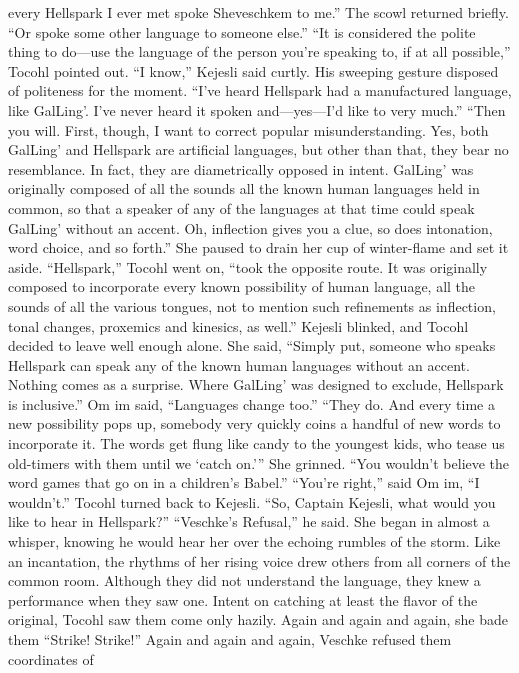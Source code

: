 \documentclass[9pt]{article}
\begin{document}
every Hellspark I ever met spoke Sheveschkem to me.” The scowl returned briefly. “Or spoke some
other language to someone else.”
“It is considered the polite thing to do—use the language of the person you’re speaking to, if at all
possible,” Tocohl pointed out.
“I know,” Kejesli said curtly. His sweeping gesture disposed of politeness for the moment. “I’ve
heard Hellspark had a manufactured language, like GalLing’. I’ve never heard it spoken and—yes—I’d
like to very much.”
“Then you will. First, though, I want to correct popular misunderstanding. Yes, both GalLing’ and
Hellspark are artificial languages, but other than that, they bear no resemblance. In fact, they are
diametrically opposed in intent. GalLing’ was originally composed of all the sounds all the known human
languages held in common, so that a speaker of any of the languages at that time could speak GalLing’
without an accent. Oh, inflection gives you a clue, so does intonation, word choice, and so forth.” She
paused to drain her cup of winter-flame and set it aside.
“Hellspark,” Tocohl went on, “took the opposite route. It was originally composed to incorporate
every known possibility of human language, all the sounds of all the various tongues, not to mention such
refinements as inflection, tonal changes, proxemics and kinesics, as well.”
Kejesli blinked, and Tocohl decided to leave well enough alone. She said, “Simply put, someone
who speaks Hellspark can speak any of the known human languages without an accent. Nothing comes
as a surprise. Where GalLing’ was designed to exclude, Hellspark is inclusive.”
Om im said, “Languages change too.”
“They do. And every time a new possibility pops up, somebody very quickly coins a handful of new
words to incorporate it. The words get flung like candy to the youngest kids, who tease us old-timers
with them until we ‘catch on.’” She grinned. “You wouldn’t believe the word games that go on in a
children’s Babel.”
“You’re right,” said Om im, “I wouldn’t.”
Tocohl turned back to Kejesli. “So, Captain Kejesli, what would you like to hear in Hellspark?”
“Veschke’s Refusal,” he said.
She began in almost a whisper, knowing he would hear her over the echoing rumbles of the storm.
Like an incantation, the rhythms of her rising voice drew others from all corners of the common room.
Although they did not understand the language, they knew a performance when they saw one. Intent on
catching at least the flavor of the original, Tocohl saw them come only hazily. Again and again and again,
she bade them “Strike! Strike!” Again and again and again, Veschke refused them coordinates of
\end{document}
